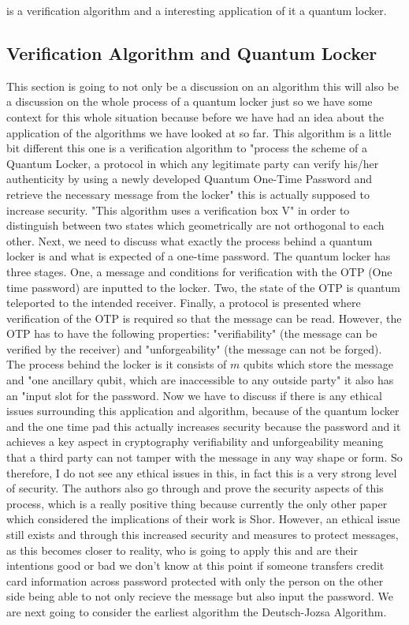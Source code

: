 \documentclass{article}
\begin{document}
is a verification algorithm and a interesting application of it a quantum locker.
  	  
\subsection{Verification Algorithm and Quantum Locker}
This section is going to not only be a discussion on an algorithm this will also be a discussion on the whole process of a quantum locker just so we have some context for this whole situation because before we have had an idea about the application of the algorithms we have looked at so far. This algorithm is a little bit different this one is a verification algorithm to "process the scheme of a Quantum Locker, a protocol in which any legitimate party can verify his/her authenticity by using a newly developed Quantum One-Time Password and retrieve the necessary message from the locker"\cite{Dash} this is actually supposed to increase security. "This algorithm uses a verification box V"\cite{Dash} in order to distinguish between two states which geometrically are not orthogonal to each other. Next, we need to discuss what exactly the process behind a quantum locker is and what is expected of a one-time password. The quantum locker has three stages. One, a message and conditions for verification with the OTP (One time password) are inputted to the locker. Two, the state of the OTP is quantum teleported to the intended receiver. Finally, a protocol is presented where verification of the OTP is required so that the message can be read. However, the OTP has to have the following properties: "verifiability" (the message can be verified by the receiver) and "unforgeability" (the message can not be forged). The process behind the locker is it consists of $m$ qubits which store the message and "one ancillary qubit, which are inaccessible to any outside party"\cite{Dash} it also has an "input slot for the password. Now we have to discuss if there is any ethical issues surrounding this application and algorithm, because of the quantum locker and the one time pad this actually increases security because the password and it achieves a key aspect in cryptography verifiability and unforgeability meaning that a third party can not tamper with the message in any way shape or form. So therefore, I do not see any ethical issues in this, in fact this is a very strong level of security. The authors also go through and prove the security aspects of this process, which is a really positive thing because currently the only other paper which considered the implications of their work is Shor. However, an ethical issue still exists and through this increased security and measures to protect messages, as this becomes closer to reality, who is going to apply this and are their intentions good or bad we don't know at this point if someone transfers credit card information across password protected with only the person on the other side being able to not only recieve the message but also input the password.  We are next going to consider the earliest algorithm the Deutsch-Jozsa Algorithm.  
\end{document}

